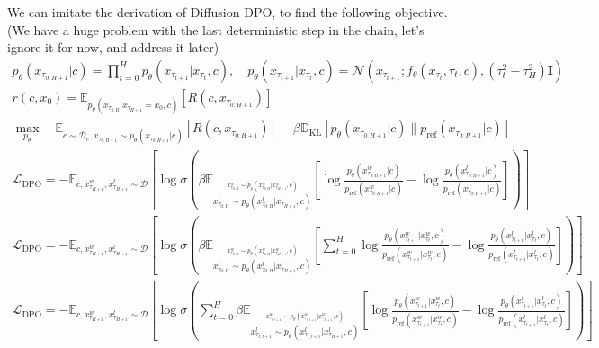 \documentclass[10pt]{article}
\begin{document}
We can imitate the derivation of Diffusion DPO, to find the following objective. (We have a huge problem with the last deterministic step in the chain, let's ignore it for now, and address it later)
\begin{gather}
	p_\theta(x_{\tau_{0:H+1}}|c)=\prod_{t=0}^{H}p_\theta(x_{\tau_{t+1}}|x_{\tau_t},c),\quad p_\theta(x_{\tau_{t+1}}|x_{\tau_t},c)=\mathcal{N}(x_{\tau_{t+1}};f_\theta(x_{\tau_t},\tau_t,c), (\tau_t^2-\tau_H^2)\mathbf{I})\\
	r(c,x_0)=\mathbb{E}_{p_\theta(x_{\tau_{0:H}}|x_{\tau_{H+1}}=x_0,c)}[R(c,x_{\tau_{0:H+1}})]                                              \\
	\max_{p_\theta}\quad\mathbb{E}_{c\sim \mathcal{D}_c,x_{\tau_{0:H+1}}\sim p_\theta(x_{\tau_{0:H+1}}|c)}\left[R(c,x_{\tau_{0:H+1}})\right]-\beta\mathbb{D}_\text{KL}\left[p_\theta(x_{\tau_{0:H+1}}|c)\|p_\text{ref}(x_{\tau_{0:H+1}}|c)\right] \\
	\mathcal{L}_\text{DPO}=-\mathbb{E}_{c,x_{\tau_{H+1}}^w,x_{\tau_{H+1}}^l\sim\mathcal{D}}\left[\log\sigma\left(\beta\mathbb{E}_{
			\stackrel{{x_{\tau_{0:H}}^w\sim p_\theta(x_{\tau_{0:H}}^w|x_{\tau_{H+1}}^w,c)}}{x_{\tau_{0:H}}^l\sim p_\theta(x_{\tau_{0:H}}^l|x_{\tau_{H+1}}^l,c)}}\left[\log\frac{p_\theta(x_{\tau_{0:H+1}}^w|c)}{p_\text{ref}(x_{\tau_{0:H+1}}^w|c)}-\log\frac{p_\theta(x_{\tau_{0:H+1}}^l|c)}{p_\text{ref}(x_{\tau_{0:H+1}}^l|c)}\right]\right)\right]\\
	\mathcal{L}_\text{DPO}=-\mathbb{E}_{c,x_{\tau_{H+1}}^w,x_{\tau_{H+1}}^l\sim\mathcal{D}}\left[\log\sigma\left(\beta\mathbb{E}_{
			\stackrel{{x_{\tau_{0:H}}^w\sim p_\theta(x_{\tau_{0:H}}^w|x_{\tau_{H+1}}^w,c)}}{x_{\tau_{0:H}}^l\sim p_\theta(x_{\tau_{0:H}}^l|x_{\tau_{H+1}}^l,c)}}\left[\sum_{t=0}^H \log\frac{p_\theta(x_{\tau_{t+1}}^w|x_{\tau_t}^w,c)}{p_\text{ref}(x_{\tau_{t+1}}^w|x_{\tau_t}^w,c)}-\log\frac{p_\theta(x_{\tau_{t+1}}^l|x_{\tau_t}^l,c)}{p_\text{ref}(x_{\tau_{t+1}}^l|x_{\tau_t}^l,c)}\right]\right)\right]\\
	\mathcal{L}_\text{DPO}=-\mathbb{E}_{c,x_{\tau_{H+1}}^w,x_{\tau_{H+1}}^l\sim\mathcal{D}}\left[\log\sigma\left(\sum_{t=0}^H\beta\mathbb{E}_{
			\stackrel{{x_{\tau_{t,t+1}}^w\sim p_\theta(x_{\tau_{t,t+1}}^w|x_{\tau_{H+1}}^w,c)}}{x_{\tau_{t,t+1}}^l\sim p_\theta(x_{\tau_{t,t+1}}^l|x_{\tau_{H+1}}^l,c)}}\left[\log\frac{p_\theta(x_{\tau_{t+1}}^w|x_{\tau_t}^w,c)}{p_\text{ref}(x_{\tau_{t+1}}^w|x_{\tau_t}^w,c)}-\log\frac{p_\theta(x_{\tau_{t+1}}^l|x_{\tau_t}^l,c)}{p_\text{ref}(x_{\tau_{t+1}}^l|x_{\tau_t}^l,c)}\right]\right)\right]
\end{gather}
\end{document}
